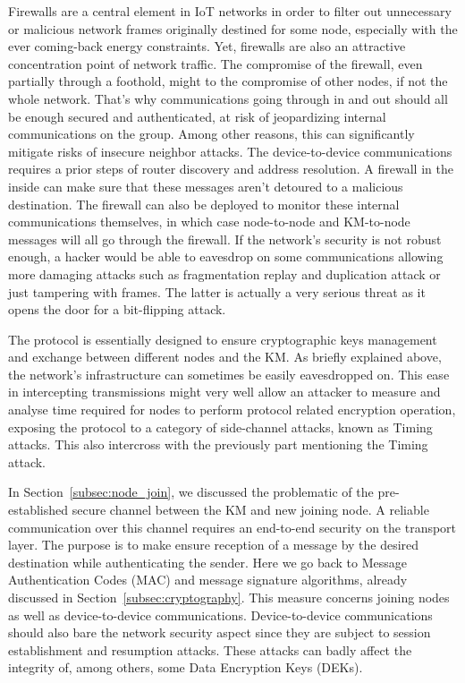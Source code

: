 Firewalls are a central element in IoT networks in order to filter out unnecessary or malicious network frames originally destined for some node, especially with the ever coming-back energy constraints. Yet, firewalls are also an attractive concentration point of network traffic. The compromise of the firewall, even partially through a foothold, might to the compromise of other nodes, if not the whole network. That’s why communications going through in and out should all be enough secured and authenticated, at risk of jeopardizing internal communications on the group. Among other reasons, this can significantly mitigate risks of insecure neighbor attacks. The device-to-device communications requires a prior steps of router discovery and address resolution. A firewall in the inside can make sure that these messages aren’t detoured to a malicious destination. The firewall can also be deployed to monitor these internal communications themselves, in which case node-to-node and KM-to-node messages will all go through the firewall. If the network’s security is not robust enough, a hacker would be able to eavesdrop on some communications allowing more damaging attacks such as fragmentation replay and duplication attack or just tampering with frames. The latter is actually a very serious threat as it opens the door for a bit-flipping attack.

The protocol is essentially designed to ensure cryptographic keys management and exchange between different nodes and the KM. As briefly explained above, the network’s infrastructure can sometimes be easily eavesdropped on. This ease in intercepting transmissions might very well allow an attacker to measure and analyse time required for nodes to perform protocol related encryption operation, exposing the protocol to a category of side-channel attacks, known as Timing attacks. This also intercross with the previously part mentioning the Timing attack.

In Section~\ref{subsec:node_join}, we discussed the problematic of the pre-established secure channel between the KM and new joining node. A reliable communication over this channel requires an end-to-end security on the transport layer. The purpose is to make ensure reception of a message by the desired destination while authenticating the sender. Here we go back to Message Authentication Codes (MAC) and message signature algorithms, already discussed in Section~\ref{subsec:cryptography}. This measure concerns joining nodes as well as device-to-device communications. Device-to-device communications should also bare the network security aspect since they are subject to session establishment and resumption attacks. These attacks can badly affect the integrity of, among others, some Data Encryption Keys (DEKs).

